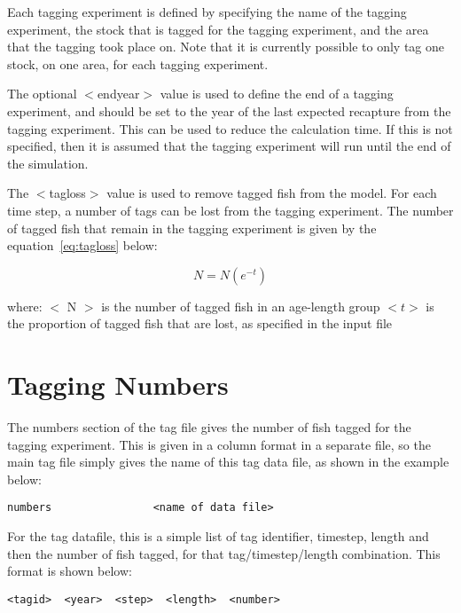 \documentclass[10pt,twoside]{book}
\begin{document}
Each tagging experiment is defined by specifying the name of the tagging experiment, the stock that is tagged for the tagging experiment, and the area that the tagging took place on.  Note that it is currently possible to only tag one stock, on one area, for each tagging experiment.

\bigskip
The optional $<$endyear$>$ value is used to define the end of a tagging experiment, and should be set to the year of the last expected recapture from the tagging experiment.  This can be used to reduce the calculation time.  If this is not specified, then it is assumed that the tagging experiment will run until the end of the simulation.

\bigskip
The $<$tagloss$>$ value is used to remove tagged fish from the model.  For each time step, a number of tags can be lost from the tagging experiment.  The number of tagged fish that remain in the tagging experiment is given by the equation~\ref{eq:tagloss} below:

\begin{equation}\label{eq:tagloss}
N = N (e^{-t})
\end{equation}

where:\newline
$<$ N $>$ is the number of tagged fish in an age-length group\newline
$<t>$ is the proportion of tagged fish that are lost, as specified in the input file

\section{Tagging Numbers}\label{sec:tagnumbers}
The numbers section of the tag file gives the number of fish tagged for the tagging experiment.  This is given in a column format in a separate file, so the main tag file simply gives the name of this tag data file, as shown in the example below:

{\small\begin{verbatim}
numbers                <name of data file>
\end{verbatim}}

For the tag datafile, this is a simple list of tag identifier, timestep, length and then the number of fish tagged, for that tag/timestep/length combination.  This format is shown below:

{\small\begin{verbatim}
<tagid>  <year>  <step>  <length>  <number>
\end{verbatim}}
\end{document}

